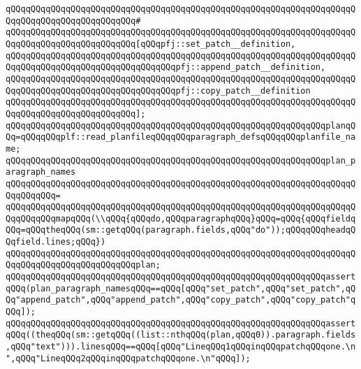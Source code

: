 \verb|qQQqqQQqqQQqqQQqqQQqqQQqqQQqqQQqqQQqqQQqqQQqqQQqqQQqqQQqqQQqqQQqqQQqqQQqqQQqqQQqqQQqqQQqqQQqqQQq#|\newline
\verb|qQQqqQQqqQQqqQQqqQQqqQQqqQQqqQQqqQQqqQQqqQQqqQQqqQQqqQQqqQQqqQQqqQQqqQQqqQQqqQQqqQQqqQQqqQQqqQQq[qQQqpfj::set_patch__definition,|\newline
\verb|qQQqqQQqqQQqqQQqqQQqqQQqqQQqqQQqqQQqqQQqqQQqqQQqqQQqqQQqqQQqqQQqqQQqqQQqqQQqqQQqqQQqqQQqqQQqqQQqqQQqqQQqpfj::append_patch__definition,|\newline
\verb|qQQqqQQqqQQqqQQqqQQqqQQqqQQqqQQqqQQqqQQqqQQqqQQqqQQqqQQqqQQqqQQqqQQqqQQqqQQqqQQqqQQqqQQqqQQqqQQqqQQqqQQqpfj::copy_patch__definition|\newline
\verb|qQQqqQQqqQQqqQQqqQQqqQQqqQQqqQQqqQQqqQQqqQQqqQQqqQQqqQQqqQQqqQQqqQQqqQQqqQQqqQQqqQQqqQQqqQQqqQQq];|\newline
\newline
\verb|qQQqqQQqqQQqqQQqqQQqqQQqqQQqqQQqqQQqqQQqqQQqqQQqqQQqqQQqqQQqqQQqplanqQQq=qQQqqQQqplf::read_planfileqQQqqQQqparagraph_defsqQQqqQQqplanfile_name;|\newline
\newline
\verb|qQQqqQQqqQQqqQQqqQQqqQQqqQQqqQQqqQQqqQQqqQQqqQQqqQQqqQQqqQQqqQQqplan_paragraph_names|\newline
\verb|qQQqqQQqqQQqqQQqqQQqqQQqqQQqqQQqqQQqqQQqqQQqqQQqqQQqqQQqqQQqqQQqqQQqqQQqqQQqqQQq=|\newline
\verb|qQQqqQQqqQQqqQQqqQQqqQQqqQQqqQQqqQQqqQQqqQQqqQQqqQQqqQQqqQQqqQQqqQQqqQQqqQQqqQQqmapqQQq(\\qQQq{qQQqdo,qQQqparagraphqQQq}qQQq=qQQq{qQQqfieldqQQq=qQQqtheqQQq(sm::getqQQq(paragraph.fields,qQQq"do"));qQQqqQQqheadqQQqfield.lines;qQQq})|\newline
\verb|qQQqqQQqqQQqqQQqqQQqqQQqqQQqqQQqqQQqqQQqqQQqqQQqqQQqqQQqqQQqqQQqqQQqqQQqqQQqqQQqqQQqqQQqqQQqqQQqplan;|\newline
\newline
\verb|qQQqqQQqqQQqqQQqqQQqqQQqqQQqqQQqqQQqqQQqqQQqqQQqqQQqqQQqqQQqqQQqassertqQQq(plan_paragraph_namesqQQq==qQQq[qQQq"set_patch",qQQq"set_patch",qQQq"append_patch",qQQq"append_patch",qQQq"copy_patch",qQQq"copy_patch"qQQq]);|\newline
\newline
\verb|qQQqqQQqqQQqqQQqqQQqqQQqqQQqqQQqqQQqqQQqqQQqqQQqqQQqqQQqqQQqqQQqassertqQQq((theqQQq(sm::getqQQq((list::nthqQQq(plan,qQQq0)).paragraph.fields,qQQq"text"))).linesqQQq==qQQq[qQQq"LineqQQq1qQQqinqQQqpatchqQQqone.\n",qQQq"LineqQQq2qQQqinqQQqpatchqQQqone.\n"qQQq]);|\newline

